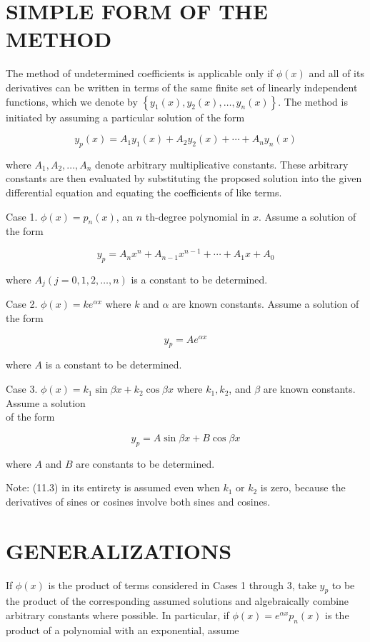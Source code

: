 \documentclass[10pt]{article}
\begin{document}
\section*{SIMPLE FORM OF THE METHOD}
The method of undetermined coefficients is applicable only if $\phi(x)$ and all of its derivatives can be written in terms of the same finite set of linearly independent functions, which we denote by $\left\{y_{1}(x), y_{2}(x), \ldots, y_{n}(x)\right\}$. The method is initiated by assuming a particular solution of the form

$$
y_{p}(x)=A_{1} y_{1}(x)+A_{2} y_{2}(x)+\cdots+A_{n} y_{n}(x)
$$

where $A_{1}, A_{2}, \ldots, A_{n}$ denote arbitrary multiplicative constants. These arbitrary constants are then evaluated by substituting the proposed solution into the given differential equation and equating the coefficients of like terms.

Case 1. $\phi(x)=p_{n}(x)$, an $n$ th-degree polynomial in $x$. Assume a solution of the form


\begin{equation*}
y_{p}=A_{n} x^{n}+A_{n-1} x^{n-1}+\cdots+A_{1} x+A_{0} \tag{11.1}
\end{equation*}


where $A_{j}(j=0,1,2, \ldots, n)$ is a constant to be determined.

Case 2. $\phi(x)=k e^{\alpha x}$ where $k$ and $\alpha$ are known constants. Assume a solution of the form


\begin{equation*}
y_{p}=A e^{\alpha x} \tag{11.2}
\end{equation*}


where $A$ is a constant to be determined.

Case 3. $\phi(x)=k_{1} \sin \beta x+k_{2} \cos \beta x$ where $k_{1}, k_{2}$, and $\beta$ are known constants. Assume a solution\\
of the form


\begin{equation*}
y_{p}=A \sin \beta x+B \cos \beta x \tag{11.3}
\end{equation*}


where $A$ and $B$ are constants to be determined.

Note: (11.3) in its entirety is assumed even when $k_{1}$ or $k_{2}$ is zero, because the derivatives of sines or cosines involve both sines and cosines.

\section*{GENERALIZATIONS}
If $\phi(x)$ is the product of terms considered in Cases 1 through 3, take $y_{p}$ to be the product of the corresponding assumed solutions and algebraically combine arbitrary constants where possible. In particular, if $\phi(x)=e^{\alpha x} p_{n}(x)$ is the product of a polynomial with an exponential, assume
\end{document}
